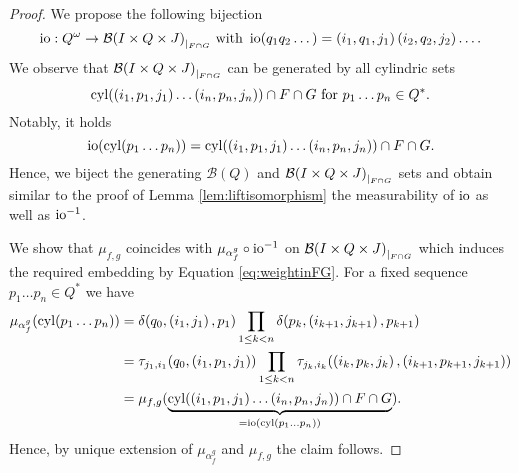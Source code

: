 \begin{proof}
  We propose the following bijection
  \begin{equation*}
    \operatorname{io}:Q^{\omega}\rightarrow{\mathcal{B}(I\times Q\times J)}_{|_{F\cap G}}\text{ with }
    \operatorname{io}(q_{1}q_{2}\dots) = \left(i_{1}, q_{1}, j_{1}\right)
      \left(i_{2}, q_{2}, j_{2}\right)\dots.
  \end{equation*}
  We observe that ${\mathcal{B}(I\times Q\times J)}_{|_{F\cap G}}$ can
  be generated by all cylindric sets
  \begin{equation*}
    \operatorname{cyl}(\left(i_{1}, p_{1}, j_{1}\right)\dots\left(i_{n}, p_{n}, j_{n}\right))
    \cap F\cap G \text{ for }p_{1}\dots p_{n}\in Q^{*}. 
  \end{equation*}
  Notably, it holds 
  \begin{equation*}
    \operatorname{io}(\operatorname{cyl}(p_{1}\dots p_{n})) = \operatorname{cyl}(\left(i_{1}, p_{1}, j_{1}\right)\dots
  \left(i_{n}, p_{n}, j_{n}\right))\cap F\cap G.
  \end{equation*}
  Hence, we biject the generating $\mathcal{B}(Q)$ and 
  ${\mathcal{B}(I\times Q\times J)}_{|_{F\cap G}}$ sets and obtain
  similar to the proof of Lemma \ref{lem:liftisomorphism} the measurability of
  $\operatorname{io}$ as well as $\operatorname{io}^{-1}$.

  We show that $\mu_{f,g}$ coincides with
  $\mu_{\alpha_{f}^{g}}\circ\operatorname{io}^{-1}$
  on ${\mathcal{B}(I\times Q\times J)}_{|_{F\cap G}}$ which induces the
  required embedding by Equation \ref{eq:weightinFG}. For a fixed sequence
  $p_{1}\dots p_{n}\in Q^{*}$ we have
  \begin{align*}
    \mu_{\alpha_{f}^{g}}(\operatorname{cyl}(p_{1}\dots p_{n})) 
    &= \delta(q_{0}, \left(i_{1}, j_{1}\right), p_{1})
      \prod\limits_{1\leq k < n}\delta(p_{k}, \left(i_{k+1}, j_{k+1}\right), 
        p_{k+1})\\
    &= \tau_{j_{1}, i_{1}}(q_{0}, \left(i_{1}, p_{1}, j_{1}\right))
      \prod\limits_{1\leq k < n}\tau_{j_{k}, i_{k}}(\left(i_{k}, p_{k}, 
        j_{k}\right),\left(i_{k+1}, p_{k+1}, j_{k+1}\right))\\
    &= \mu_{f, g}(\underbrace{\operatorname{cyl}(\left(i_{1}, p_{1}, j_{1}\right)
      \dots\left(i_{n}, p_{n}, j_{n}\right))\cap F\cap G}_{
        = \operatorname{io}(\operatorname{cyl}(p_{1}\dots p_{n}))
      }).
  \end{align*}
  Hence, by unique extension of $\mu_{\alpha_{f}^{g}}$ and $\mu_{f,g}$ the
  claim follows.
\end{proof}

